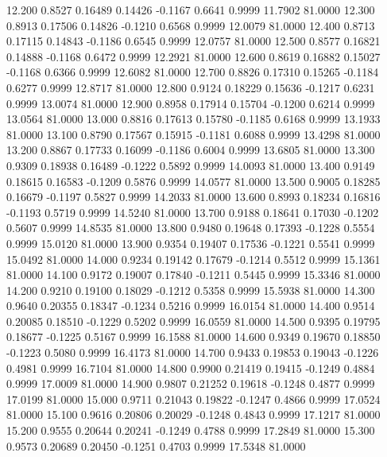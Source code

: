   12.200   0.8527   0.16489   0.14426  -0.1167   0.6641   0.9999  11.7902  81.0000
  12.300   0.8913   0.17506   0.14826  -0.1210   0.6568   0.9999  12.0079  81.0000
  12.400   0.8713   0.17115   0.14843  -0.1186   0.6545   0.9999  12.0757  81.0000
  12.500   0.8577   0.16821   0.14888  -0.1168   0.6472   0.9999  12.2921  81.0000
  12.600   0.8619   0.16882   0.15027  -0.1168   0.6366   0.9999  12.6082  81.0000
  12.700   0.8826   0.17310   0.15265  -0.1184   0.6277   0.9999  12.8717  81.0000
  12.800   0.9124   0.18229   0.15636  -0.1217   0.6231   0.9999  13.0074  81.0000
  12.900   0.8958   0.17914   0.15704  -0.1200   0.6214   0.9999  13.0564  81.0000
  13.000   0.8816   0.17613   0.15780  -0.1185   0.6168   0.9999  13.1933  81.0000
  13.100   0.8790   0.17567   0.15915  -0.1181   0.6088   0.9999  13.4298  81.0000
  13.200   0.8867   0.17733   0.16099  -0.1186   0.6004   0.9999  13.6805  81.0000
  13.300   0.9309   0.18938   0.16489  -0.1222   0.5892   0.9999  14.0093  81.0000
  13.400   0.9149   0.18615   0.16583  -0.1209   0.5876   0.9999  14.0577  81.0000
  13.500   0.9005   0.18285   0.16679  -0.1197   0.5827   0.9999  14.2033  81.0000
  13.600   0.8993   0.18234   0.16816  -0.1193   0.5719   0.9999  14.5240  81.0000
  13.700   0.9188   0.18641   0.17030  -0.1202   0.5607   0.9999  14.8535  81.0000
  13.800   0.9480   0.19648   0.17393  -0.1228   0.5554   0.9999  15.0120  81.0000
  13.900   0.9354   0.19407   0.17536  -0.1221   0.5541   0.9999  15.0492  81.0000
  14.000   0.9234   0.19142   0.17679  -0.1214   0.5512   0.9999  15.1361  81.0000
  14.100   0.9172   0.19007   0.17840  -0.1211   0.5445   0.9999  15.3346  81.0000
  14.200   0.9210   0.19100   0.18029  -0.1212   0.5358   0.9999  15.5938  81.0000
  14.300   0.9640   0.20355   0.18347  -0.1234   0.5216   0.9999  16.0154  81.0000
  14.400   0.9514   0.20085   0.18510  -0.1229   0.5202   0.9999  16.0559  81.0000
  14.500   0.9395   0.19795   0.18677  -0.1225   0.5167   0.9999  16.1588  81.0000
  14.600   0.9349   0.19670   0.18850  -0.1223   0.5080   0.9999  16.4173  81.0000
  14.700   0.9433   0.19853   0.19043  -0.1226   0.4981   0.9999  16.7104  81.0000
  14.800   0.9900   0.21419   0.19415  -0.1249   0.4884   0.9999  17.0009  81.0000
  14.900   0.9807   0.21252   0.19618  -0.1248   0.4877   0.9999  17.0199  81.0000
  15.000   0.9711   0.21043   0.19822  -0.1247   0.4866   0.9999  17.0524  81.0000
  15.100   0.9616   0.20806   0.20029  -0.1248   0.4843   0.9999  17.1217  81.0000
  15.200   0.9555   0.20644   0.20241  -0.1249   0.4788   0.9999  17.2849  81.0000
  15.300   0.9573   0.20689   0.20450  -0.1251   0.4703   0.9999  17.5348  81.0000
